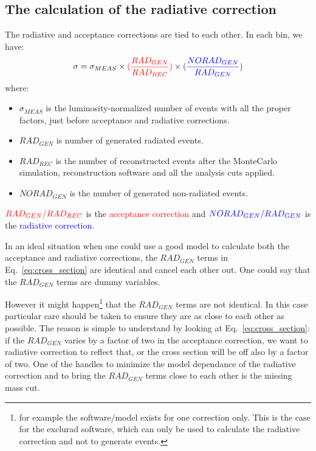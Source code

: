 \clearpage\newpage
\subsection{The calculation of the radiative correction}
The radiative and acceptance corrections are tied to each other. In each bin, we have:
\begin{equation}\label{eq:cross_section}
	\sigma = \sigma_{MEAS}\times \textcolor{red} {(\frac{RAD_{GEN}}{RAD_{REC}})}
                         \times \textcolor{blue}{(\frac{NORAD_{GEN}}{RAD_{GEN}})}
\end{equation}
where:
\begin{itemize}
\item $\sigma_{MEAS}$ is the luminosity-normalized number of events with all the proper
factors, just before acceptance and radiative corrections.
\item $RAD_{GEN}$ is number of generated radiated events.
\item $RAD_{REC}$ is the number of reconstructed events after the MonteCarlo simulation,
reconstruction software and all the analysis cuts applied.
\item $NORAD_{GEN}$ is the number of generated non-radiated events.
\end{itemize}
$\textcolor{red}{RAD_{GEN} / RAD_{REC}}$ is the \textcolor{red}{acceptance correction} and
$\textcolor{blue}{NORAD_{GEN} / RAD_{GEN}}$ is the \textcolor{blue}{radiative correction}.

In an ideal situation when one could use a good model to calculate both the acceptance and
radiative corrections, the $RAD_{GEN}$ terms in Eq.~\eqref{eq:cross_section} are identical
and cancel each other out. One could say that the $RAD_{GEN}$ terms are dummy variables.

However it might happen\footnote{for example the software/model exists for one correction
only. This is the case for the exclurad software, which can only be used to calculate the
radiative correction and not to generate events.} that the $RAD_{GEN}$ terms are not
identical. In this case particular care should be taken to ensure they are as close
to each other as possible. The reason is simple to understand by looking at
Eq.~\eqref{eq:cross_section}: if the $RAD_{GEN}$ varies by a factor of two in
the acceptance correction, we want to radiative correction to reflect that,
or the cross section will be off also by a factor of two. One of the handles to
minimize the model dependance of the radiative correction and to bring the $RAD_{GEN}$
terms close to each other is the missing mass cut.

